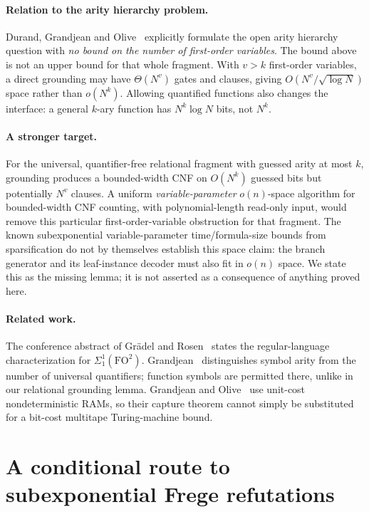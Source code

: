 \documentclass[11pt]{article}
\theoremstyle{definition}
\theoremstyle{remark}
\begin{document}
\paragraph{Relation to the arity hierarchy problem.}
Durand, Grandjean and Olive~\cite[Introduction]{DGO04} explicitly
formulate the
open arity hierarchy question with \emph{no bound on the number of
first-order variables}. The bound above is not an upper bound for that
whole fragment. With $v>k$ first-order variables, a direct grounding may
have $\Theta(N^v)$ gates and clauses, giving
$O(N^v/\sqrt{\log N})$ space rather than $o(N^k)$.
Allowing quantified functions also changes the interface: a general
$k$-ary function has $N^k\log N$ bits, not $N^k$.

\paragraph{A stronger target.}
For the universal, quantifier-free relational fragment with guessed
arity at most $k$, grounding produces a bounded-width CNF on
$O(N^k)$ guessed bits but potentially $N^v$ clauses. A uniform
\emph{variable-parameter} $o(n)$-space algorithm for bounded-width CNF
counting, with polynomial-length read-only input, would remove this
particular first-order-variable obstruction for that fragment.
The known subexponential variable-parameter time/formula-size bounds
from sparsification do not by themselves establish this space claim:
the branch generator and its leaf-instance decoder must also fit in
$o(n)$ space. We state this as the missing lemma; it is not asserted
as a consequence of anything proved here.

\paragraph{Related work.}
The conference abstract of Gr\"adel and Rosen~\cite{GR99} states the
regular-language characterization for $\Sigma^1_1(\mathrm{FO}^2)$.
Grandjean~\cite[Theorem~0.1 and introduction]{Gra84} distinguishes
symbol arity from the number of universal quantifiers; function
symbols are permitted there, unlike in our relational grounding
lemma. Grandjean and Olive~\cite{GO04} use unit-cost nondeterministic
RAMs, so their capture theorem cannot simply be substituted for a
bit-cost multitape Turing-machine bound.


\section{A conditional route to subexponential Frege refutations}
\label{sec:few-order-frege-milestone}
\end{document}

